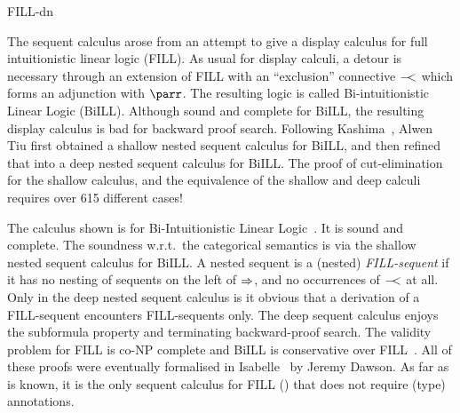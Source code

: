 \begin{entry}{FILL-dn}
\begin{history}
  The sequent calculus arose from an attempt to give a display
  calculus for full intuitionistic linear logic (FILL). As usual for
  display calculi, a detour is necessary through an extension of FILL
  with an ``exclusion'' connective ${-\!\!\!<}$ which forms an adjunction
  with $\parr$. The resulting logic is called Bi-intuitionistic Linear
  Logic (BiILL). Although sound and complete for BiILL, the resulting
  display calculus is bad for backward proof search. Following
  Kashima~\cite{DBLP:journals/sLogica/Kashima94}, Alwen Tiu first
  obtained a shallow nested sequent calculus for BiILL, and then
  refined that into a deep nested sequent calculus for BiILL. The
  proof of cut-elimination for the shallow calculus, and the
  equivalence of the shallow and deep calculi requires over 615
  different cases!
\end{history}

\begin{technicalities}
  The calculus shown is for Bi-Intuitionistic Linear
  Logic~\cite{DBLP:conf/csl/CloustonDGT13}. It is sound and
  complete. The soundness w.r.t.\ the categorical semantics is via
  the shallow nested sequent calculus
  for BiILL. A nested sequent is a (nested) \emph{FILL-sequent} if it
  has no nesting of sequents on the left of $\Rightarrow$, and no occurrences
  of ${-\!\!\!<}$ at all. Only in the deep nested sequent calculus is it
  obvious that a derivation of a FILL-sequent encounters FILL-sequents
  only. The deep sequent calculus enjoys the subformula property and
  terminating backward-proof search. The validity problem for FILL is
  co-NP complete and BiILL is conservative over
  FILL~\cite{DBLP:conf/csl/CloustonDGT13}. All of these proofs were
  eventually formalised in
  Isabelle~\cite{DBLP:conf/ifipTCS/DawsonCGT14} by Jeremy Dawson. As
  far as is known, it is the only sequent calculus for FILL
  () that does not require (type) annotations.
\end{technicalities}













\end{entry}
